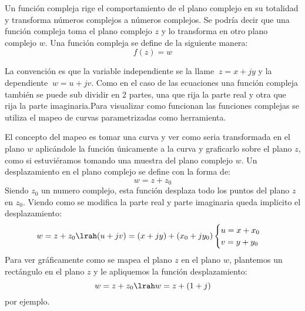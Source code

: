 Un función compleja rige el comportamiento de el plano complejo en su totalidad y transforma números complejos a números complejos. Se podría decir que una función compleja toma el plano complejo $z$ y lo transforma en otro plano complejo $w$. 
Una función compleja se define de la siguiente manera:
\begin{equation}
    f(z)=w
\end{equation}
\begin{figure}[H]
\centering
    \begin{minipage}{0.4\textwidth}
    \centering
       
    \label{fig:PlanoCF1}
    \end{minipage}%
    \begin{minipage}[t]{0.2\textwidth}
    \end{minipage}%
   \begin{minipage}{0.4\textwidth}
    \centering
       
    \label{fig:PlanoCF2}
    \end{minipage}%
    \caption{}
    \label{fig:CompPLF}
\end{figure}
La convención es que la variable independiente se la llame $\ z=x+jy$ y la dependiente $\ w=u+jv$. Como en el caso de las ecuaciones una función compleja también se puede sub dividir en 2 partes, una que rija la parte real y otra que rija la parte imaginaria.Para visualizar como funcionan las funciones complejas se utiliza el mapeo de curvas parametrizadas como herramienta.

El concepto del mapeo es tomar una curva y ver como seria transformada en el plano $w$ aplicándole la función únicamente a la curva y graficarlo sobre el plano $z$, como si estuviéramos tomando una muestra del plano complejo $w$.
Un desplazamiento en el plano complejo se define con la forma de:
\begin{equation}\label{eq:defDespF}
    w=z+z_0
\end{equation}
Siendo $z_0$ un numero complejo, esta función desplaza todo los puntos del plano $z$ en $z_0$. Viendo como se modifica la parte real y parte imaginaria queda implicito el desplazamiento:
\begin{equation}
    w=z+z_0\lrah(u+jv)=(x+jy)+(x_0+jy_0)
    \begin{cases}
        u=x+x_0\\
        v=y+y_0
    \end{cases}
\end{equation}
Para ver gráficamente como se mapea el plano $z$ en el plano $w$, plantemos un rectángulo en el plano $z$ y le apliquemos la función desplazamiento:
\begin{equation}\label{eq:EjemDespF}
    w=z+z_0\lrah w=z+(1+j)    
\end{equation}
por ejemplo. 

